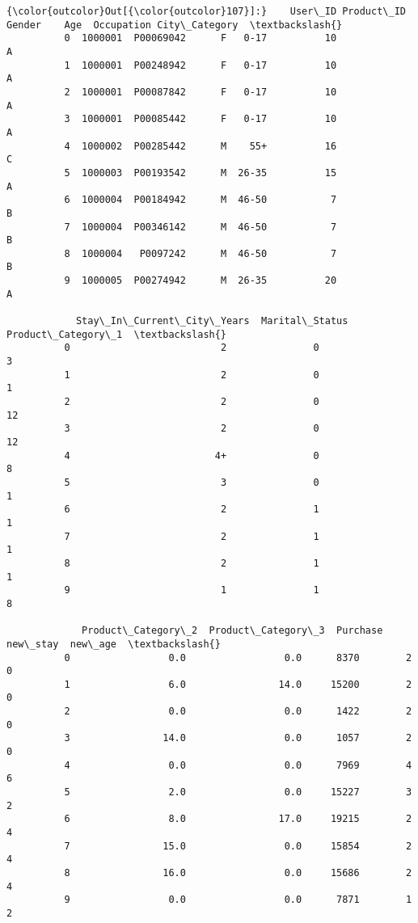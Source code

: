 \documentclass[11pt]{article}
\begin{document}
\begin{Verbatim}[commandchars=\\\{\}]
{\color{outcolor}Out[{\color{outcolor}107}]:}    User\_ID Product\_ID Gender    Age  Occupation City\_Category  \textbackslash{}
          0  1000001  P00069042      F   0-17          10             A   
          1  1000001  P00248942      F   0-17          10             A   
          2  1000001  P00087842      F   0-17          10             A   
          3  1000001  P00085442      F   0-17          10             A   
          4  1000002  P00285442      M    55+          16             C   
          5  1000003  P00193542      M  26-35          15             A   
          6  1000004  P00184942      M  46-50           7             B   
          7  1000004  P00346142      M  46-50           7             B   
          8  1000004   P0097242      M  46-50           7             B   
          9  1000005  P00274942      M  26-35          20             A   
          
            Stay\_In\_Current\_City\_Years  Marital\_Status  Product\_Category\_1  \textbackslash{}
          0                          2               0                   3   
          1                          2               0                   1   
          2                          2               0                  12   
          3                          2               0                  12   
          4                         4+               0                   8   
          5                          3               0                   1   
          6                          2               1                   1   
          7                          2               1                   1   
          8                          2               1                   1   
          9                          1               1                   8   
          
             Product\_Category\_2  Product\_Category\_3  Purchase new\_stay  new\_age  \textbackslash{}
          0                 0.0                 0.0      8370        2        0   
          1                 6.0                14.0     15200        2        0   
          2                 0.0                 0.0      1422        2        0   
          3                14.0                 0.0      1057        2        0   
          4                 0.0                 0.0      7969        4        6   
          5                 2.0                 0.0     15227        3        2   
          6                 8.0                17.0     19215        2        4   
          7                15.0                 0.0     15854        2        4   
          8                16.0                 0.0     15686        2        4   
          9                 0.0                 0.0      7871        1        2   
          

\end{Verbatim}
\end{document}
